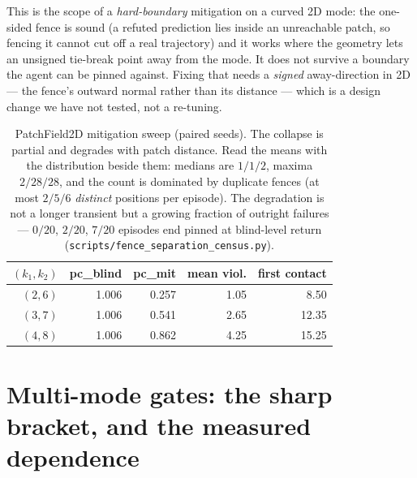 \documentclass[11pt]{article}
\theoremstyle{definition}
\theoremstyle{remark}
\begin{document}
This is the scope of a \emph{hard-boundary} mitigation on a curved 2D mode: the one-sided fence is sound (a refuted prediction lies inside an unreachable patch, so fencing it cannot cut off a real trajectory) and it works where the geometry lets an unsigned tie-break point away from the mode. It does not survive a boundary the agent can be pinned against. Fixing that needs a \emph{signed} away-direction in 2D --- the fence's outward normal rather than its distance --- which is a design change we have not tested, not a re-tuning.

\begin{table}[ht]
\centering
\small
\begin{tabular}{rrrrr}
\toprule
$(k_1, k_2)$ & pc\_blind & pc\_mit & mean viol. & first contact \\
\midrule
$(2, 6)$ & 1.006 & 0.257 & 1.05 & 8.50 \\
$(3, 7)$ & 1.006 & 0.541 & 2.65 & 12.35 \\
$(4, 8)$ & 1.006 & 0.862 & 4.25 & 15.25 \\
\bottomrule
\end{tabular}
\caption{PatchField2D mitigation sweep (paired seeds). The collapse is partial and degrades with patch distance. Read the means with the distribution beside them: medians are $1/1/2$, maxima $2/28/28$, and the count is dominated by duplicate fences (at most $2/5/6$ \emph{distinct} positions per episode). The degradation is not a longer transient but a growing fraction of outright failures --- $0/20$, $2/20$, $7/20$ episodes end pinned at blind-level return (\texttt{scripts/\allowbreak fence\_\allowbreak separation\_\allowbreak census.py}).}
\label{tab:patch2d-mitigation}
\end{table}


\section{Multi-mode gates: the sharp bracket, and the measured dependence}
\label{sup:multimode}
\end{document}
